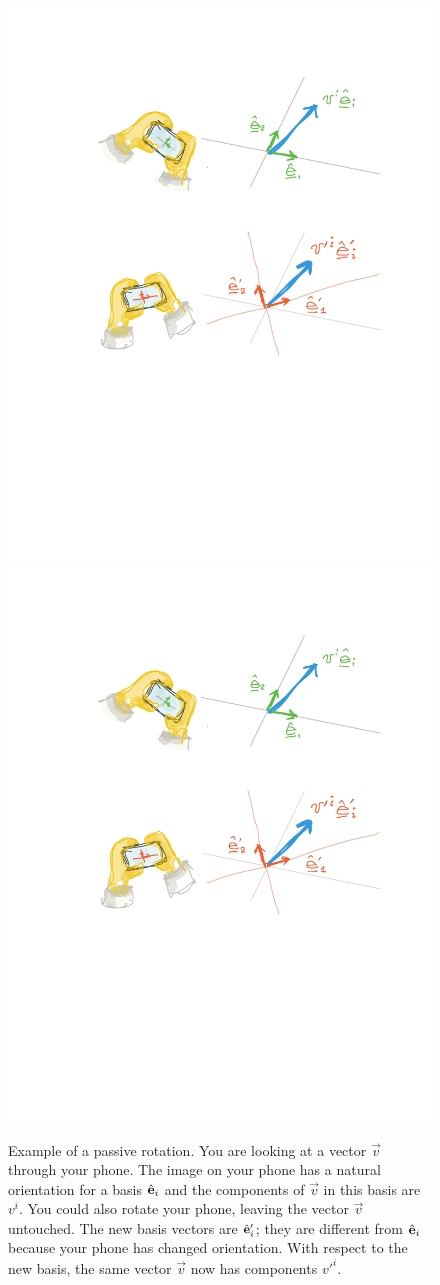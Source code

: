 \begin{figure}[tb]
    \centering
    \includegraphics[width=.43\textwidth]{figures/rotate_1.pdf}
    \quad\quad
    \includegraphics[width=.43\textwidth]{figures/rotate_2.pdf}
    \caption{Example of a passive rotation. You are looking at a vector $\vec{v}$ through your phone. The image on your phone has a natural orientation for a basis $\hat{\mathbf{e}}_i$ and the components of $\vec{v}$ in this basis are $v^i$. You could also rotate your phone, leaving the vector $\vec{v}$ untouched. The new basis vectors are $\hat{\mathbf{e}}_i'$; they are different from $\hat{\mathbf{e}}_i$ because your phone has changed orientation. With respect to the new basis, the same vector $\vec{v}$ now has components $v'^i$.}
    \label{fig:passive:rotation}
\end{figure}

